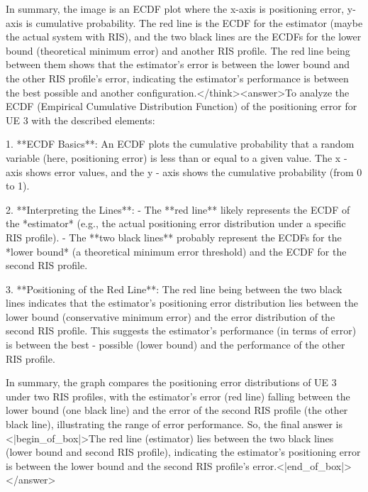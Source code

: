 In summary, the image is an ECDF plot where the x-axis is positioning error, y-axis is cumulative probability. The red line is the ECDF for the estimator (maybe the actual system with RIS), and the two black lines are the ECDFs for the lower bound (theoretical minimum error) and another RIS profile. The red line being between them shows that the estimator's error is between the lower bound and the other RIS profile's error, indicating the estimator's performance is between the best possible and another configuration.</think><answer>To analyze the ECDF (Empirical Cumulative Distribution Function) of the positioning error for UE 3 with the described elements:  

1. **ECDF Basics**: An ECDF plots the cumulative probability that a random variable (here, positioning error) is less than or equal to a given value. The x - axis shows error values, and the y - axis shows the cumulative probability (from 0 to 1).  

2. **Interpreting the Lines**:  
   - The **red line** likely represents the ECDF of the *estimator* (e.g., the actual positioning error distribution under a specific RIS profile).  
   - The **two black lines** probably represent the ECDFs for the *lower bound* (a theoretical minimum error threshold) and the ECDF for the second RIS profile.  

3. **Positioning of the Red Line**: The red line being between the two black lines indicates that the estimator’s positioning error distribution lies between the lower bound (conservative minimum error) and the error distribution of the second RIS profile. This suggests the estimator’s performance (in terms of error) is between the best - possible (lower bound) and the performance of the other RIS profile.  


In summary, the graph compares the positioning error distributions of UE 3 under two RIS profiles, with the estimator’s error (red line) falling between the lower bound (one black line) and the error of the second RIS profile (the other black line), illustrating the range of error performance.  
So, the final answer is <|begin_of_box|>The red line (estimator) lies between the two black lines (lower bound and second RIS profile), indicating the estimator’s positioning error is between the lower bound and the second RIS profile’s error.<|end_of_box|></answer>